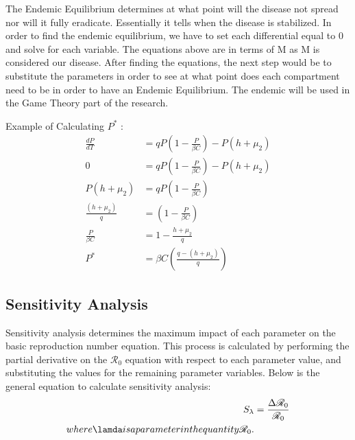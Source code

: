 \documentclass[12pt]{article}
\begin{document}
The Endemic Equilibrium determines at what point will the disease not spread nor will it fully eradicate. Essentially it tells when the disease is stabilized. In order to find the endemic equilibrium, we have to set each differential equal to 0 and solve for each variable. The equations above are in terms of M as M is considered our disease. After finding the equations, the next step would be to substitute the parameters in order to see at what point does each compartment need to be in order to have an Endemic Equilibrium. The endemic will be used in the Game Theory part of the research. 

Example of Calculating $P^{*}$ :
\begin{align*}
        \frac{dP}{dT} &= qP\left(1-\frac{P}{\beta C}\right) - P(h + \mu_{2})\\
        0 &= qP\left(1-\frac{P}{\beta C}\right) - P(h + \mu_{2})\\
        P(h+ \mu_{2}) &= qP\left(1-\frac{P}{\beta C}\right)\\
        \frac{(h+ \mu_{2})}{q} &= \left(1-\frac{P}{\beta C}\right)\\
        \frac{P}{\beta C} &= 1 - \frac{h+\mu_{2}}{q}\\
        P^{*} &= \beta C \left(\frac{q-(h+\mu_{2})}{q}\right)
    \end{align*}

\subsection{Sensitivity Analysis}
Sensitivity analysis determines the maximum impact of each parameter on the basic reproduction number equation. This process is calculated by performing the partial derivative on the $\mathscr{R}_0$ equation with respect to each parameter value, and substituting the values for the remaining parameter variables. Below is the general equation to calculate sensitivity analysis: \\
\begin{align*}
    S_{\lambda} &=  \frac{\Delta \mathscr{R}_0}{\mathscr{R}_0} \\
    where \lamda is a parameter in the quantity \mathscr{R}_0.
\end{align*}
\end{document}
